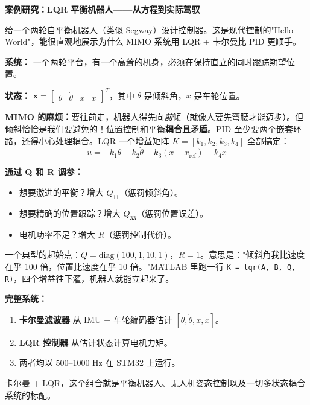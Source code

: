 \vspace{0.5em}
\begin{mdframed}[linewidth=1pt, innertopmargin=10pt, innerbottommargin=10pt]
\textbf{案例研究：LQR 平衡机器人——从方程到实际驾驭}

\vspace{0.3em}
给一个两轮自平衡机器人（类似 Segway）设计控制器。这是现代控制的"Hello World"，能很直观地展示为什么 MIMO 系统用 LQR + 卡尔曼比 PID 更顺手。

\textbf{系统：} 一个两轮平台，有一个高耸的机身，必须在保持直立的同时跟踪期望位置。

\textbf{状态：} $\mathbf{x} = \begin{bmatrix} \theta & \dot{\theta} & x & \dot{x} \end{bmatrix}^T$，其中 $\theta$ 是倾斜角，$x$ 是车轮位置。

\textbf{MIMO 的麻烦：}要往前走，机器人得先向\textit{前}倾（就像人要先弯腰才能迈步）。但倾斜恰恰是我们要避免的！位置控制和平衡\textbf{耦合且矛盾}。PID 至少要两个嵌套环路，还得小心处理耦合。LQR 一个增益矩阵 $K = [k_1, k_2, k_3, k_4]$ 全部搞定：
\[
u = -k_1 \theta - k_2 \dot{\theta} - k_3 (x - x_{\text{ref}}) - k_4 \dot{x}
\]

\textbf{通过 Q 和 R 调参：}
\begin{itemize}[nosep]
    \item 想要激进的平衡？增大 $Q_{11}$（惩罚倾斜角）。
    \item 想要精确的位置跟踪？增大 $Q_{33}$（惩罚位置误差）。
    \item 电机功率不足？增大 $R$（惩罚控制代价）。
\end{itemize}

一个典型的起始点：$Q = \text{diag}(100, 1, 10, 1)$，$R = 1$。意思是："倾斜角我比速度在乎 100 倍，位置比速度在乎 10 倍。"MATLAB 里跑一行 \texttt{K = lqr(A, B, Q, R)}，四个增益往下灌，机器人就能立起来了。

\textbf{完整系统：}
\begin{enumerate}[nosep]
    \item \textbf{卡尔曼滤波器} 从 IMU + 车轮编码器估计 $[\theta, \dot{\theta}, x, \dot{x}]$。
    \item \textbf{LQR 控制器} 从估计状态计算电机力矩。
    \item 两者均以 500--1000 Hz 在 STM32 上运行。
\end{enumerate}

卡尔曼 + LQR，这个组合就是平衡机器人、无人机姿态控制以及一切多状态耦合系统的标配。
\end{mdframed}

